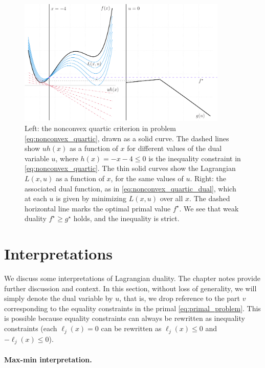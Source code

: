 \begin{figure}[tb]
\centering
\includegraphics[width=0.89\textwidth]{fig/nonconvex_quartic.pdf}
\caption{Left: the nonconvex quartic criterion in problem
  \eqref{eq:nonconvex_quartic}, drawn as a solid curve. The dashed lines show
  $uh(x)$ as a function of $x$ for different values of the dual variable $u$,
  where $h(x) = -x-4 \leq 0$ is the inequality constraint in
  \eqref{eq:nonconvex_quartic}. The thin solid curves show the Lagrangian
  $L(x,u)$ as a function of $x$, for the same values of $u$. Right: the
  associated dual function, as in \eqref{eq:nonconvex_quartic_dual}, which at
  each $u$ is given by minimizing $L(x,u)$ over all $x$. The dashed horizontal
  line marks the optimal primal value $f^\star$. We see that weak duality
  $f^\star \geq g^\star$ holds, and the inequality is strict.}  
\label{fig:nonconvex_quartic}
\end{figure}

\section{Interpretations}
\label{sec:duality_interpretations}

We discuss some interpretations of Lagrangian duality. The chapter notes 
provide further discussion and context. In this section, without loss of
generality, we will simply denote the dual variable by $u$, that is, we drop 
reference to the part $v$ corresponding to the equality constraints in the
primal \eqref{eq:primal_problem}. This is possible because equality constraints
can always be rewritten as inequality constraints (each $\ell_j(x) = 0$ can be 
rewritten as $\ell_j(x) \leq 0$ and $-\ell_j(x) \leq 0$). 

\paragraph{Max-min interpretation.}

